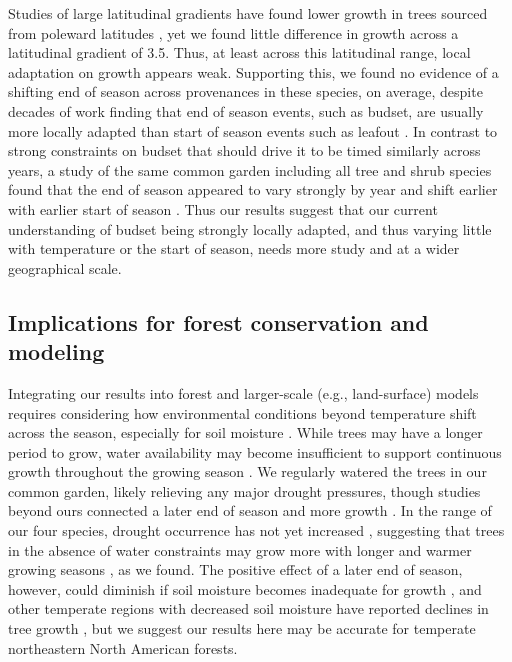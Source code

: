 \documentclass{article}\usepackage[]{graphicx}\usepackage[]{xcolor}
\begin{document}
Studies of large latitudinal gradients have found lower growth in trees sourced from poleward latitudes \citep{aitken_time_2016,soolanayakanahally_timing_2013}, yet we found little difference in growth across a latitudinal gradient of 3.5\degree. Thus, at least across this latitudinal range, local adaptation on growth appears weak. Supporting this, we found no evidence of a shifting end of season across provenances in these species, on average, despite decades of work finding that end of season events, such as budset, are usually more locally adapted than start of season events such as leafout \citep{kramer_effect_1936,habjorg_photoperiodic_1978,soolanayakanahally_timing_2013,aitken_time_2016,zeng_weak_2024}. In contrast to strong constraints on budset that should drive it to be timed similarly across years, a study of the same common garden including all tree and shrub species found that the end of season appeared to vary strongly by year and shift earlier with earlier start of season \citep{buonaiuto_early_2026}. Thus our results suggest that our current understanding of budset being strongly locally adapted, and thus varying little with temperature or the start of season, needs more study and at a wider geographical scale.

\subsection*{Implications for forest conservation and modeling}
Integrating our results into forest and larger-scale (e.g., land-surface) models requires considering how environmental conditions beyond temperature shift across the season, especially for soil moisture \citep{gaoEarlierStartThermal2022,li_widespread_2023}. While trees may have a longer period to grow, water availability may become insufficient to support continuous growth throughout the growing season \citep{lempereur_growth_2015, wang_seasonal_2025}. We regularly watered the trees in our common garden, likely relieving any major drought pressures, though studies beyond ours connected a later end of season and more growth \citep[see:][]{gaoEarlierStartThermal2022,wang_seasonal_2025}. In the range of our four species, drought occurrence has not yet increased \citep{nationalcentersforenvironmentalinformationncei_north_2026,agel_drought_2025}, suggesting that trees in the absence of water constraints may grow more with longer and warmer growing seasons \citep{cook_uncertainty_2011,agel_drought_2025,dorangeville_beneficial_2018}, as we found. The positive effect of a later end of season, however, could diminish if soil moisture becomes inadequate for growth \citep[as recently shown in our region by][]{jurado_increasing_2025}, and other temperate regions with decreased soil moisture have reported declines in tree growth \citep[e.g.,][]{spinoni_will_2018,zhang_drought_2021}, but we suggest our results here may be accurate for temperate northeastern North American forests.
\end{document}
